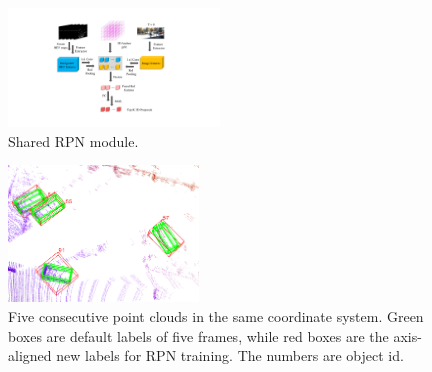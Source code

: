 \documentclass[a4paper, 10pt, conference]{ieeeconf}      %
\begin{document}
\begin{figure}
	\vspace{-0.6cm}
	\rule{0pt}{1ex}
	\begin{center}
		\includegraphics[trim={7cm, 2cm, 7.8cm, 2cm}, clip,width=0.5\textwidth]{images/rpn.pdf}
	\end{center}
	\caption{Shared RPN module.}
	\label{fig:rpn}
	\vspace{-0.5cm}
\end{figure}

\begin{figure}
	\vspace{-0.6cm}
	\rule{0pt}{1ex}
	\begin{center}
		\includegraphics[width=0.45\textwidth]{images/integrated_boxes.png}
	\end{center}
	\caption{Five consecutive point clouds in the same coordinate system. Green boxes are default labels of five frames, while red boxes are the axis-aligned new labels for RPN training. The numbers are object id.}
	\label{fig:integrated_boxes}
	\vspace{-0.6cm}
\end{figure}
\end{document}
